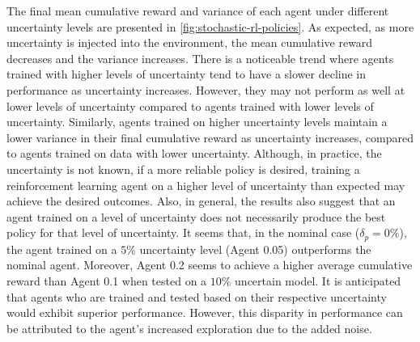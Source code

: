 The final mean cumulative reward and variance of each agent under different uncertainty levels are presented in \ref{fig:stochastic-rl-policies}. As expected, as more uncertainty is injected into the environment, the mean cumulative reward decreases and the variance increases. There is a noticeable trend where agents trained with higher levels of uncertainty tend to have a slower decline in performance as uncertainty increases. However, they may not perform as well at lower levels of uncertainty compared to agents trained with lower levels of uncertainty. Similarly, agents trained on higher uncertainty levels maintain a lower variance in their final cumulative reward as uncertainty increases, compared to agents trained on data with lower uncertainty. Although, in practice, the uncertainty is not known, if a more reliable policy is desired, training a reinforcement learning agent on a higher level of uncertainty than expected may achieve the desired outcomes. Also, in general, the results also suggest that an agent trained on a level of uncertainty does not necessarily produce the best policy for that level of uncertainty. It seems that, in the nominal case ($\delta_p = 0\%$), the agent trained on a $5\%$ uncertainty level (Agent 0.05) outperforms the nominal agent. Moreover, Agent 0.2 seems to achieve a higher average cumulative reward than Agent 0.1 when tested on a $10\%$ uncertain model. It is anticipated that agents who are trained and tested based on their respective uncertainty would exhibit superior performance. However, this disparity in performance can be attributed to the agent’s increased exploration due to the added noise.

